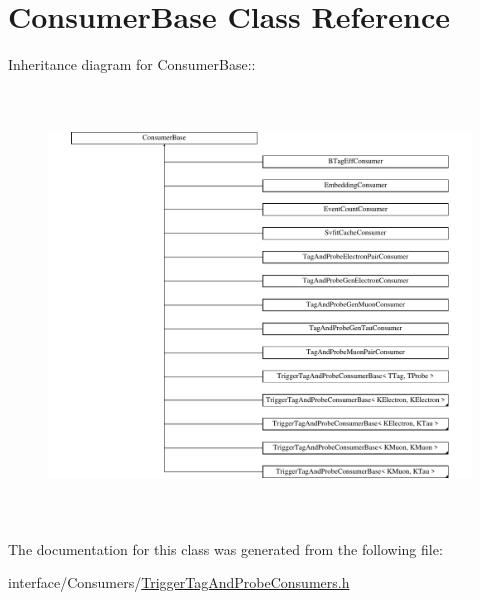 \hypertarget{classConsumerBase}{
\section{ConsumerBase Class Reference}
\label{classConsumerBase}
}
Inheritance diagram for ConsumerBase::\begin{figure}[H]
\begin{center}
\leavevmode
\includegraphics[height=11.4441cm]{classConsumerBase}
\end{center}
\end{figure}


The documentation for this class was generated from the following file:\begin{DoxyCompactItemize}
\item 
interface/Consumers/\hyperlink{TriggerTagAndProbeConsumers_8h}{TriggerTagAndProbeConsumers.h}\end{DoxyCompactItemize}
